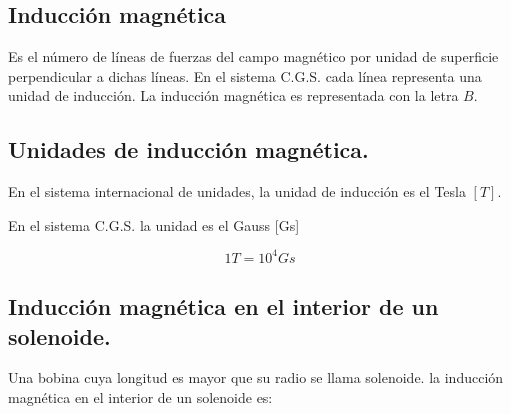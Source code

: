 \documentclass[../main]{subfiles}
\begin{document}
\subsection{Inducción magnética}

Es el número de líneas de fuerzas del campo magnético por unidad de superficie perpendicular a dichas líneas.  En el sistema C.G.S. cada línea representa una unidad de inducción.
La inducción magnética es representada con la letra $B$.

\subsection{Unidades de inducción magnética.}

En el sistema internacional de unidades, la unidad de inducción es el Tesla $[T]$.

En el sistema C.G.S. la unidad es el Gauss [Gs] 

\begin{equation*}
    1T=10^4Gs
\end{equation*}

\subsection{Inducción magnética en el interior de un solenoide.}

Una bobina cuya longitud es mayor que su radio se llama solenoide. la inducción magnética en el interior de un solenoide es:

\end{document}

